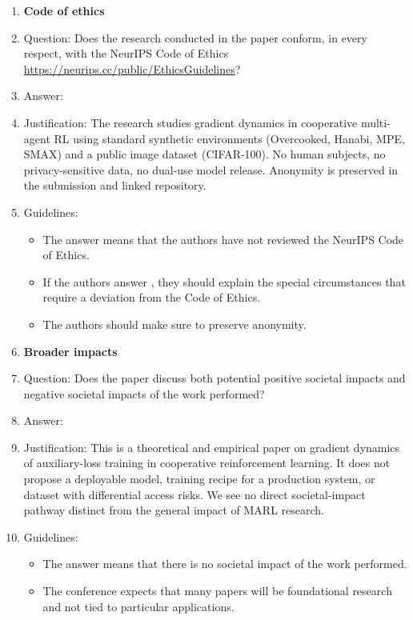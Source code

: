 \begin{enumerate}
\item {\bf Code of ethics}
    \item[] Question: Does the research conducted in the paper conform, in every respect, with the NeurIPS Code of Ethics \url{https://neurips.cc/public/EthicsGuidelines}?
    \item[] Answer: \answerYes{}
    \item[] Justification: The research studies gradient dynamics in cooperative multi-agent RL using standard synthetic environments (Overcooked, Hanabi, MPE, SMAX) and a public image dataset (CIFAR-100). No human subjects, no privacy-sensitive data, no dual-use model release. Anonymity is preserved in the submission and linked repository.
    \item[] Guidelines:
    \begin{itemize}
        \item The answer \answerNA{} means that the authors have not reviewed the NeurIPS Code of Ethics.
        \item If the authors answer \answerNo, they should explain the special circumstances that require a deviation from the Code of Ethics.
        \item The authors should make sure to preserve anonymity.
    \end{itemize}


\item {\bf Broader impacts}
    \item[] Question: Does the paper discuss both potential positive societal impacts and negative societal impacts of the work performed?
    \item[] Answer: \answerNA{}
    \item[] Justification: This is a theoretical and empirical paper on gradient dynamics of auxiliary-loss training in cooperative reinforcement learning. It does not propose a deployable model, training recipe for a production system, or dataset with differential access risks. We see no direct societal-impact pathway distinct from the general impact of MARL research.
    \item[] Guidelines:
    \begin{itemize}
        \item The answer \answerNA{} means that there is no societal impact of the work performed.
        \item The conference expects that many papers will be foundational research and not tied to particular applications.
    \end{itemize}


\end{enumerate}
